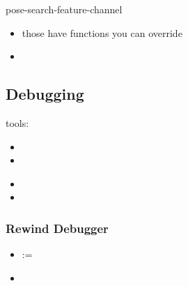         pose-search-feature-channel
        \begin{itemize}
            \item those have functions you can override
            \item 
        \end{itemize}

        \subsection{Debugging}
            tools:
            \begin{itemize}
                \item {}
                \item {}
            \end{itemize}

            \begin{itemize}
                \item {}
                \item {}
            \end{itemize}

            \subsubsection{Rewind Debugger}
                \begin{itemize}
                    \item {} := 
                    \item 
                \end{itemize}